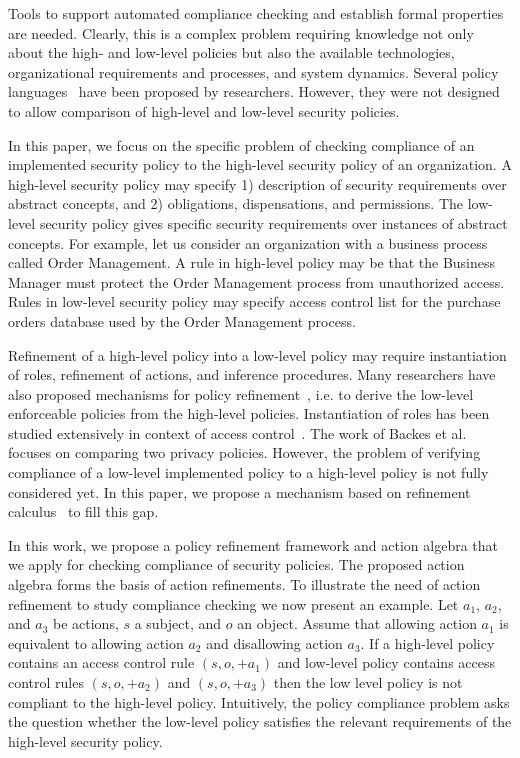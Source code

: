 \documentclass[12pt,journal,letterpaper,onecolumn]{IEEEtran}
\begin{document}
Tools to support automated compliance checking and establish formal
properties are needed. Clearly, this is a complex problem requiring
knowledge not only about the high- and low-level policies but also
the available technologies, organizational requirements and
processes, and system dynamics. Several policy
languages~\cite{Damianou01,Kagal02,Jajodia01,bettini02} have been
proposed by researchers. However, they were not designed to allow
comparison of high-level and low-level security policies.


In this paper, we focus on the specific problem of checking
compliance of an implemented security policy to the high-level
security policy of an organization. A high-level security policy may
specify 1) description of security requirements over abstract
concepts, and 2) obligations, dispensations, and permissions. The
low-level security policy gives specific security requirements over
instances of abstract concepts. For example, let us consider an
organization with a business process called Order Management. A rule
in high-level policy may be that the Business Manager must protect
the Order Management process from unauthorized access. Rules in
low-level security policy may specify access control list for the
purchase orders database used by the Order Management process.


Refinement of a high-level policy into a low-level policy may
require instantiation of roles, refinement of actions, and inference
procedures.  Many researchers have also proposed mechanisms
for policy refinement~\cite{Bandara04,Rubio06,Rochaeli07},
i.e. to derive the low-level enforceable policies from the
high-level policies. Instantiation of roles has been studied extensively in
context of access control~\cite{Ferraiolo}.
The work of Backes et al.~\cite{Backes04} focuses on comparing two privacy policies.
However, the problem of verifying
compliance of a low-level implemented policy to a high-level policy
is not fully considered yet. In this paper, we propose a mechanism
based on refinement calculus~\cite{Back} to fill this gap.

In this work, we propose a policy refinement framework and
action algebra that we apply for checking compliance of security
policies. The proposed action algebra forms the basis of action
 refinements.  To illustrate the need
of action refinement to study compliance checking we now present an
example. Let $a_1$, $a_2$, and $a_3$ be actions, $s$ a subject, and
$o$ an object. Assume that allowing action $a_1$ is equivalent to
allowing action $a_2$ and disallowing action $a_3$. If a high-level
policy contains an access control rule $(s,o,+a_1)$ and low-level
policy contains access control rules $(s, o, +a_2)$ and $(s, o,
+a_3)$ then the low level policy is not compliant to the high-level policy.
Intuitively, the
policy compliance problem asks the question whether the low-level
policy satisfies the relevant requirements of the high-level
security policy.
\end{document}
